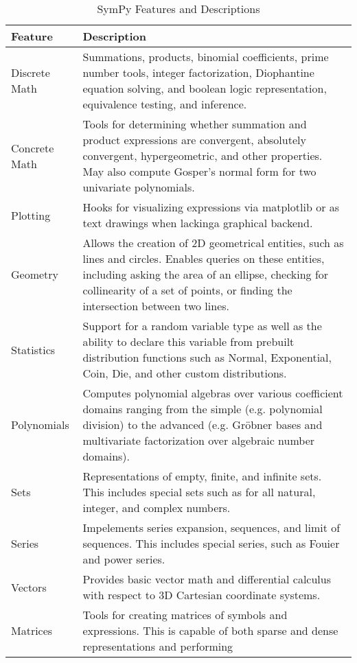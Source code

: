 
\begin{table}
\label{features-table}
\caption{SymPy Features and Descriptions}
\begin{tabular}[htbc]{|l|l|}
\hline
\textbf{Feature} & \textbf{Description} \\
\hline
Discrete Math & Summations, products, binomial coefficients, prime number
    tools, integer factorization, Diophantine equation solving, and
    boolean logic representation, equivalence testing, and inference.\\
Concrete Math & Tools for determining whether summation and product
    expressions are convergent, absolutely convergent, hypergeometric, and
    other properties. May also compute Gosper's normal form
    \cite{petkovvsek1996bak} for two univariate polynomials.\\
Plotting & Hooks for visualizing expressions via matplotlib \cite{Hunter:2007}
    or as text drawings when lackinga graphical backend.\\
Geometry & Allows the creation of 2D geometrical entities,
    such as lines and circles. Enables queries on these entities, including
    asking the area of an ellipse, checking for collinearity of a set of
    points, or finding the intersection between two lines.\\
Statistics & Support for a random variable type as well as the ability to
    declare this variable from prebuilt distribution functions such as
    Normal, Exponential, Coin, Die, and other custom distributions.\\
Polynomials & Computes polynomial algebras over various coefficient domains
    ranging from the simple (e.g. polynomial division) to the advanced
    (e.g. Gr\"obner bases \cite{adams1994introduction} and multivariate
    factorization over algebraic number domains).\\
Sets & Representations of empty, finite, and infinite sets. This includes
    special sets such as for all natural, integer, and complex numbers.\\
Series & Impelements series expansion, sequences, and limit of sequences.
    This includes special series, such as Fouier and power series.\\
Vectors & Provides basic vector math and differential calculus with respect
    to 3D Cartesian coordinate systems.\\
Matrices & Tools for creating matrices of symbols and expressions.
    This is capable of both sparse and dense representations and performing

\end{tabular}
\end{table}
